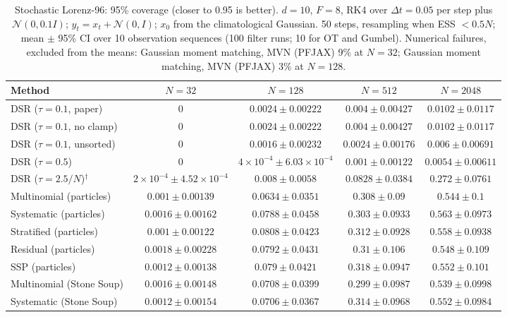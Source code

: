 \begin{table}[H]
\centering
\small
\caption{Stochastic Lorenz-96: 95\% coverage (closer to 0.95 is better). $d{=}10$, $F{=}8$, RK4 over $\Delta t{=}0.05$ per step plus $\mathcal N(0,0.1I)$; $y_t=x_t+\mathcal N(0,I)$; $x_0$ from the climatological Gaussian. 50 steps, resampling when ESS $<0.5N$; mean $\pm$ 95\% CI over 10 observation sequences (100 filter runs; 10 for OT and Gumbel). Numerical failures, excluded from the means: Gaussian moment matching, MVN (PFJAX) 9\% at $N{=}32$; Gaussian moment matching, MVN (PFJAX) 3\% at $N{=}128$.}
\label{tab:lorenz96-coverage95}
\begin{adjustbox}{max width=\linewidth}
\begin{tabular}{lcccc}
\toprule
Method & $N{=}32$ & $N{=}128$ & $N{=}512$ & $N{=}2048$ \\
\midrule
DSR ($\tau{=}0.1$, paper) & $0$ & $0.0024\pm0.00222$ & $0.004\pm0.00427$ & $0.0102\pm0.0117$ \\
DSR ($\tau{=}0.1$, no clamp) & $0$ & $0.0024\pm0.00222$ & $0.004\pm0.00427$ & $0.0102\pm0.0117$ \\
DSR ($\tau{=}0.1$, unsorted) & $0$ & $0.0016\pm0.00232$ & $0.0024\pm0.00176$ & $0.006\pm0.00691$ \\
DSR ($\tau{=}0.5$) & $0$ & $4\times10^{-4}\pm6.03\times10^{-4}$ & $0.001\pm0.00122$ & $0.0054\pm0.00611$ \\
DSR ($\tau{=}2.5/N$)$^\dagger$ & $2\times10^{-4}\pm4.52\times10^{-4}$ & $0.008\pm0.0058$ & $0.0828\pm0.0384$ & $0.272\pm0.0761$ \\
\midrule
Multinomial (particles) & $0.001\pm0.00139$ & $0.0634\pm0.0351$ & $0.308\pm0.09$ & $0.544\pm0.1$ \\
Systematic (particles) & $0.0016\pm0.00162$ & $0.0788\pm0.0458$ & $0.303\pm0.0933$ & $0.563\pm0.0973$ \\
Stratified (particles) & $0.001\pm0.00122$ & $0.0808\pm0.0423$ & $0.312\pm0.0928$ & $0.558\pm0.0938$ \\
Residual (particles) & $0.0018\pm0.00228$ & $0.0792\pm0.0431$ & $0.31\pm0.106$ & $0.548\pm0.109$ \\
SSP (particles) & $0.0012\pm0.00138$ & $0.079\pm0.0421$ & $0.318\pm0.0947$ & $0.552\pm0.101$ \\
Multinomial (Stone Soup) & $0.0016\pm0.00148$ & $0.0708\pm0.0399$ & $0.299\pm0.0987$ & $0.539\pm0.0998$ \\
Systematic (Stone Soup) & $0.0012\pm0.00154$ & $0.0706\pm0.0367$ & $0.314\pm0.0968$ & $0.552\pm0.0984$ \\

\end{tabular}
\end{adjustbox}
\end{table}
